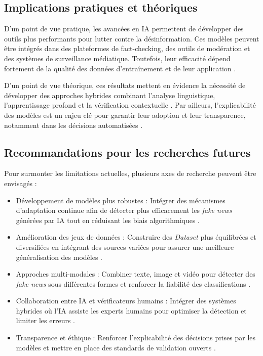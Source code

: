 \documentclass[a4paper,12pt, twocolumn]{article}
\begin{document}
\begin{twocolumn}
\subsection{Implications pratiques et théoriques}
D’un point de vue pratique, les avancées en IA permettent de développer des outils plus performants pour lutter contre la désinformation. Ces modèles peuvent être intégrés dans des plateformes de fact-checking, des outils de modération et des systèmes de surveillance médiatique. Toutefois, leur efficacité dépend fortement de la qualité des données d’entraînement et de leur application \cite{rai_fake_2022}.

D’un point de vue théorique, ces résultats mettent en évidence la nécessité de développer des approches hybrides combinant l’analyse linguistique, l’apprentissage profond et la vérification contextuelle \cite{beseiso_context-enhanced_2025}. Par ailleurs, l’explicabilité des modèles est un enjeu clé pour garantir leur adoption et leur transparence, notamment dans les décisions automatisées \cite{truica_its_2023}.

\subsection{Recommandations pour les recherches futures}
Pour surmonter les limitations actuelles, plusieurs axes de recherche peuvent être envisagés :
\begin{itemize}
\item Développement de modèles plus robustes : Intégrer des mécanismes d’adaptation continue afin de détecter plus efficacement les \textit{fake news} générées par IA tout en réduisant les biais algorithmiques \cite{hu_bad_2024}.
\item Amélioration des jeux de données : Construire des \textit{Dataset} plus équilibrées et diversifiées en intégrant des sources variées pour assurer une meilleure généralisation des modèles \cite{verma_welfake_2021}.
\item Approches multi-modales : Combiner texte, image et vidéo pour détecter des \textit{fake news} sous différentes formes et renforcer la fiabilité des classifications \cite{alghamdi_towards_2023}.
\item Collaboration entre IA et vérificateurs humains : Intégrer des systèmes hybrides où l’IA assiste les experts humains pour optimiser la détection et limiter les erreurs \cite{rai_fake_2022}.
\item Transparence et éthique : Renforcer l’explicabilité des décisions prises par les modèles et mettre en place des standards de validation ouverts \cite{truica_its_2023}.
\end{itemize}


\end{twocolumn}
\end{document}
